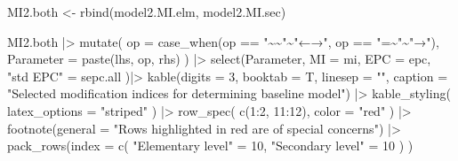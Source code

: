 \documentclass[
]{article}
\newenvironment{Shaded}{\begin{snugshade}}{\end{snugshade}}
\newcommand{\AttributeTok}[1]{\textcolor[rgb]{0.77,0.63,0.00}{#1}}
\newcommand{\DecValTok}[1]{\textcolor[rgb]{0.00,0.00,0.81}{#1}}
\newcommand{\FunctionTok}[1]{\textcolor[rgb]{0.00,0.00,0.00}{#1}}
\newcommand{\NormalTok}[1]{#1}
\newcommand{\OtherTok}[1]{\textcolor[rgb]{0.56,0.35,0.01}{#1}}
\newcommand{\SpecialCharTok}[1]{\textcolor[rgb]{0.00,0.00,0.00}{#1}}
\newcommand{\StringTok}[1]{\textcolor[rgb]{0.31,0.60,0.02}{#1}}
\begin{document}
\begin{Shaded}
\begin{Highlighting}[]
\NormalTok{MI2.both }\OtherTok{\textless{}{-}} \FunctionTok{rbind}\NormalTok{(model2.MI.elm, model2.MI.sec)}

\NormalTok{MI2.both    }\SpecialCharTok{|\textgreater{}} 
  \FunctionTok{mutate}\NormalTok{(}
    \AttributeTok{op =} \FunctionTok{case\_when}\NormalTok{(op }\SpecialCharTok{==} \StringTok{"\textasciitilde{}\textasciitilde{}"}\SpecialCharTok{\textasciitilde{}}\StringTok{"←→"}\NormalTok{,}
\NormalTok{                   op }\SpecialCharTok{==} \StringTok{"=\textasciitilde{}"}\SpecialCharTok{\textasciitilde{}}\StringTok{"→"}\NormalTok{), }
    \AttributeTok{Parameter =} 
           \FunctionTok{paste}\NormalTok{(lhs, op, rhs)}
\NormalTok{         ) }\SpecialCharTok{|\textgreater{}}
  \FunctionTok{select}\NormalTok{(Parameter, }
         \AttributeTok{MI =}\NormalTok{ mi, }
         \AttributeTok{EPC =}\NormalTok{ epc, }
         \StringTok{"std EPC"} \OtherTok{=}\NormalTok{ sepc.all}
\NormalTok{         )}\SpecialCharTok{|\textgreater{}}
  \FunctionTok{kable}\NormalTok{(}\AttributeTok{digits =} \DecValTok{3}\NormalTok{,}
        \AttributeTok{booktab =}\NormalTok{ T,}
        \AttributeTok{linesep =} \StringTok{""}\NormalTok{,}
        \AttributeTok{caption =} 
          \StringTok{"Selected modification indices for determining baseline model"}\NormalTok{) }\SpecialCharTok{|\textgreater{}}
  \FunctionTok{kable\_styling}\NormalTok{(}
    \AttributeTok{latex\_options =} \StringTok{"striped"}
\NormalTok{    ) }\SpecialCharTok{|\textgreater{}}
  \FunctionTok{row\_spec}\NormalTok{(}
    \FunctionTok{c}\NormalTok{(}\DecValTok{1}\SpecialCharTok{:}\DecValTok{2}\NormalTok{, }\DecValTok{11}\SpecialCharTok{:}\DecValTok{12}\NormalTok{), }
    \AttributeTok{color =} \StringTok{"red"}
\NormalTok{    ) }\SpecialCharTok{|\textgreater{}} 
  \FunctionTok{footnote}\NormalTok{(}\AttributeTok{general =} 
             \StringTok{"Rows highlighted in red are of special concerns"}\NormalTok{) }\SpecialCharTok{|\textgreater{}} 
  \FunctionTok{pack\_rows}\NormalTok{(}\AttributeTok{index =} \FunctionTok{c}\NormalTok{(}
    \StringTok{"Elementary level"} \OtherTok{=} \DecValTok{10}\NormalTok{,}
    \StringTok{"Secondary level"} \OtherTok{=} \DecValTok{10}
\NormalTok{    )}
\NormalTok{    )}
\end{Highlighting}
\end{Shaded}
\end{document}

